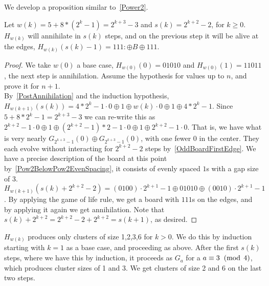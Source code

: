 \documentclass[12pt,letterpaper]{article}
\begin{document}
We develop a proposition similar to~\cref{Power2}.
\begin{prop}\label{101BoardsBig} %
  Let $w(k)=5+8*(2^k-1)=2^{k+3}-3$ and $s(k)=2^{k+2}-2$, for $k\geq 0$. 
  $H_{w(k)}$ will annihilate in $s(k)$ steps, and on the previous step it will be alive at the edges, $H_{w(k)}(s(k)-1)=111:\oplus B\oplus 111$.
\end{prop}
\begin{proof}
  We take $w(0)$ a base case, $H_{w(0)}(0)=01010$ and $H_{w(0)}(1)=11011$, the next step is annihilation. Assume the hypothesis for values up to $n$, and prove it for $n+1$. \\
  By~\cref{PostAnnihilation} and the induction hypothesis, $H_{w(k+1)}(s(k))=4*2^k-1\cdot 0 \oplus 1\oplus w(k)\cdot 0 \oplus 1 \oplus 4*2^k-1$. Since $5+8*2^k-1 = 2^{k+3}-3$ we can re-write this as $2^{k+2}-1\cdot 0 \oplus 1\oplus (2^{k+2}-1)*2-1\cdot 0\oplus 1\oplus 2^{k+2}-1\cdot 0$. That is, we have what is very nearly $G_{2^{k+3}-1}(0)\oplus G_{2^{k+3}-1}(0)$, with one fewer 0 in the center. They each evolve without interacting for $2^{k+2}-2$ steps by~\cref{OddBoardFirstEdge}. We have a precise description of the board at this point by~\cref{Pow2BelowPow2EvenSpacing}, it consists of evenly spaced $1$s with a gap size of $3$. $H_{w(k+1)}(s(k)+2^{k+2}-2)=(0100)\cdot 2^{k+1}-1\oplus 01010 \oplus (0010)\cdot 2^{k+1}-1$. By applying the game of life rule, we get a board with $111$s on the edges, and by applying it again we get annihilation. Note that $s(k)+2^{k+2} = 2^{k+2}-2+2^{k+2}=s(k+1)$, as desired.
\end{proof}
\begin{cor}
  $H_{w(k)}$ produces only clusters of size 1,2,3,6 for $k>0$. We do this by induction starting with $k=1$ as a base case, and proceeding as above. After the first $s(k)$ steps, where we have this by induction, it proceeds as $G_a$ for a $a\equiv 3 \;\;(\operatorname{mod}\;4)$, which produces cluster sizes of 1 and 3. We get clusters of size 2 and 6 on the last two steps.
\end{cor}
\end{document}

